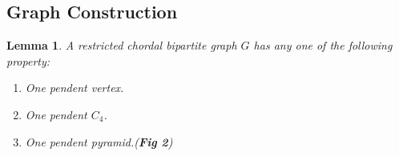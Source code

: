\documentclass[11pt]{article}
\newtheorem{lemma}{Lemma}
\begin{document}
\subsection{Graph Construction}
	\begin{lemma} \label{pendent property}
	A restricted chordal bipartite graph $G$ has any one of the following property:
	\begin{enumerate}[label=(\roman*)]
	\item One pendent vertex.
	\item One pendent $C_4$.
	\item One pendent pyramid.(\textbf{Fig 2})
	\end{enumerate}
	\end{lemma}
	
\end{document}
